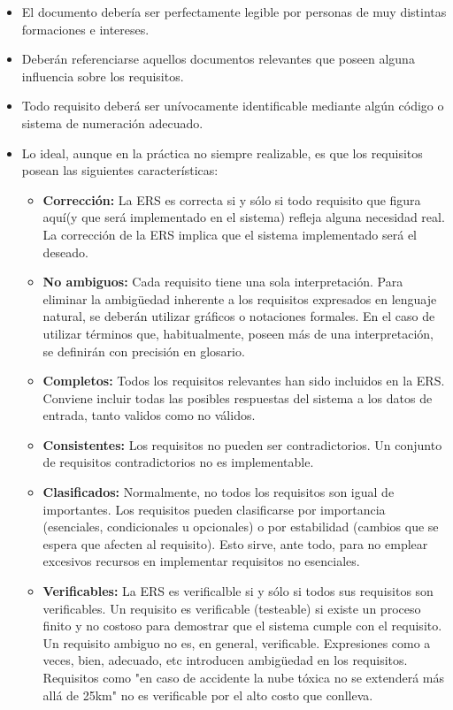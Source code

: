 \documentclass[12pt,a4paper, twosite]{article}
\begin{document}
\begin{itemize}
\item El documento debería ser perfectamente legible por personas de muy
distintas formaciones e intereses.

\item Deberán referenciarse aquellos documentos relevantes que poseen
alguna influencia sobre los requisitos.

\item Todo requisito deberá ser unívocamente identificable mediante algún
código o sistema de numeración adecuado.

\item Lo ideal, aunque en la práctica no siempre realizable, es que los
requisitos posean las siguientes características: 

\begin{itemize}
\item \textbf{Corrección:} La ERS es correcta si y sólo si todo requisito que
figura aquí(y que será implementado en el sistema) refleja alguna
necesidad real. La corrección de la ERS implica que el sistema
implementado será el deseado.

\item \textbf{No ambiguos:} Cada requisito tiene una sola interpretación. Para
eliminar la ambigüedad inherente a los requisitos expresados en
lenguaje natural, se deberán utilizar gráficos o notaciones
formales. En el caso de utilizar términos que, habitualmente,
poseen más de una interpretación, se definirán con precisión en
glosario.

\item \textbf{Completos:} Todos los requisitos relevantes han sido incluidos en
la ERS. Conviene incluir todas las posibles respuestas del sistema
a los datos de entrada, tanto validos como no válidos.

\item \textbf{Consistentes:} Los requisitos no pueden ser contradictorios. Un
conjunto de requisitos contradictorios no es implementable.

\item \textbf{Clasificados:} Normalmente, no todos los requisitos son igual de
importantes. Los requisitos pueden clasificarse por importancia
(esenciales, condicionales u opcionales) o por estabilidad (cambios
que se espera que afecten al requisito). Esto sirve, ante todo,
para no emplear excesivos recursos en implementar requisitos no
esenciales.

\item \textbf{Verificables:} La ERS es verificalble si y sólo si todos sus
requisitos son verificables. Un requisito es verificable
(testeable) si existe un proceso finito y no costoso para
demostrar que el sistema cumple con el requisito. Un requisito
ambiguo no es, en general, verificable. Expresiones como a veces,
bien, adecuado, etc introducen ambigüedad en los
requisitos. Requisitos como "en caso de accidente la nube tóxica
no se extenderá más allá de 25km" no es verificable por el alto
costo que conlleva.


\end{itemize}
\end{itemize}
\end{document}
